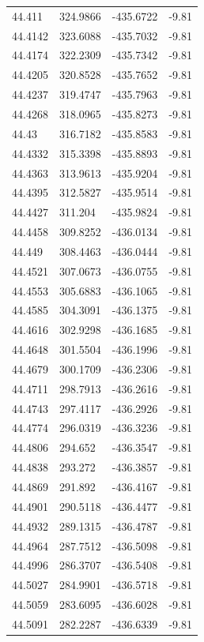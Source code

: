 \begin{table}[H]
\begin{tabular}{llll}
44.411 & 324.9866 & -435.6722 & -9.81 \\
44.4142 & 323.6088 & -435.7032 & -9.81 \\
44.4174 & 322.2309 & -435.7342 & -9.81 \\
44.4205 & 320.8528 & -435.7652 & -9.81 \\
44.4237 & 319.4747 & -435.7963 & -9.81 \\
44.4268 & 318.0965 & -435.8273 & -9.81 \\
44.43 & 316.7182 & -435.8583 & -9.81 \\
44.4332 & 315.3398 & -435.8893 & -9.81 \\
44.4363 & 313.9613 & -435.9204 & -9.81 \\
44.4395 & 312.5827 & -435.9514 & -9.81 \\
44.4427 & 311.204 & -435.9824 & -9.81 \\
44.4458 & 309.8252 & -436.0134 & -9.81 \\
44.449 & 308.4463 & -436.0444 & -9.81 \\
44.4521 & 307.0673 & -436.0755 & -9.81 \\
44.4553 & 305.6883 & -436.1065 & -9.81 \\
44.4585 & 304.3091 & -436.1375 & -9.81 \\
44.4616 & 302.9298 & -436.1685 & -9.81 \\
44.4648 & 301.5504 & -436.1996 & -9.81 \\
44.4679 & 300.1709 & -436.2306 & -9.81 \\
44.4711 & 298.7913 & -436.2616 & -9.81 \\
44.4743 & 297.4117 & -436.2926 & -9.81 \\
44.4774 & 296.0319 & -436.3236 & -9.81 \\
44.4806 & 294.652 & -436.3547 & -9.81 \\
44.4838 & 293.272 & -436.3857 & -9.81 \\
44.4869 & 291.892 & -436.4167 & -9.81 \\
44.4901 & 290.5118 & -436.4477 & -9.81 \\
44.4932 & 289.1315 & -436.4787 & -9.81 \\
44.4964 & 287.7512 & -436.5098 & -9.81 \\
44.4996 & 286.3707 & -436.5408 & -9.81 \\
44.5027 & 284.9901 & -436.5718 & -9.81 \\
44.5059 & 283.6095 & -436.6028 & -9.81 \\
44.5091 & 282.2287 & -436.6339 & -9.81 \\

\end{tabular}
\end{table}
